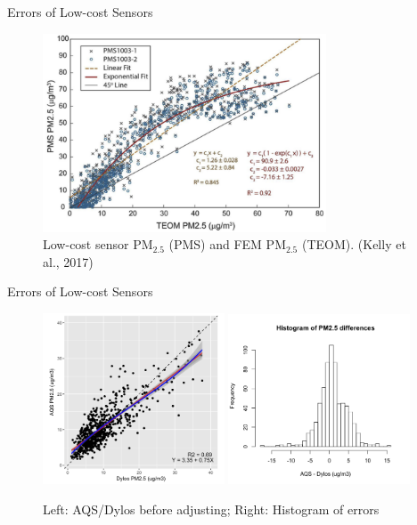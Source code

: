 \documentclass[handout]{beamer} %
\begin{document}
\begin{frame}{Errors of Low-cost Sensors}
    \begin{figure}
        \centering
        \includegraphics[width=0.75\textwidth]{img/appendix/Aim2/kelly2017.png}
        \caption{Low-cost sensor PM$_{2.5}$ (PMS) and FEM PM$_{2.5}$ (TEOM). (Kelly et al., 2017)}
    \end{figure}
\end{frame}

\begin{frame}{Errors of Low-cost Sensors}
    \begin{figure}
        \centering
        \includegraphics[width=0.48\textwidth]{img/appendix/Aim2/scatter_reg.jpg}
        \includegraphics[width=0.48\textwidth]{img/appendix/Aim2/hist.png}
        \caption{Left: AQS/Dylos before adjusting; Right: Histogram of errors}
    \end{figure}
\end{frame}
\end{document}
